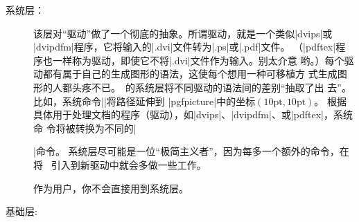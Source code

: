 \begin{description}
\item[系统层：]

  该层对“驱动”做了一个彻底的抽象。所谓驱动，就是一个类似|dvips|或
  |dvipdfm|程序，它将输入的|.dvi|文件转为|.ps|或|.pdf|文件。
  （|pdftex|程序也一样称为驱动，即使它不将|.dvi|文件作为输入。别太介意
  哟。）每个驱动都有属于自己的生成图形的语法，这使每个想用一种可移植方
  式生成图形的人都头疼不已。\pgfname\ 的系统层将不同驱动的语法间的差别“抽取了出
  去”。比如，系统命令|\pgfsys@lineto{10pt}{10pt}|将路径延伸到
  |{pgfpicture}|中的坐标$(10\mathrm{pt},10\mathrm{pt})$。 
  根据具体用于处理文档的程序（驱动），如|dvips|、|dvipdfm|、或|pdftex|，系统命
  令将被转换为不同的|\special|命令。
  系统层尽可能是一位“极简主义者”，因为每多一个额外的命令，在将
  \pgfname\ 引入到新驱动中就会多做一些工作。

  作为用户，你不会直接用到系统层。
  
\item[基础层:]


\end{description}
